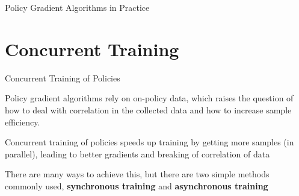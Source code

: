 \begin{frame}{Policy Gradient Algorithms in Practice}
\setcounter{subfigure}{0}
\begin{figure}[htbp]
\centering

\hfill %

\end{figure}
\vspace{2pt}
    
\end{frame}

\section{Concurrent Training}

\begin{frame}{Concurrent Training of Policies}

Policy gradient algorithms rely on on-policy data, which raises the question of how to deal with correlation in the collected data and how to increase sample efficiency. 

\blist
    \item Concurrent training of policies speeds up training by getting more samples (in parallel), leading to better gradients and breaking of correlation of data
    \item There are many ways to achieve this, but there are two simple methods commonly used, \textbf{synchronous training} and \textbf{asynchronous training}
\elist
    
\end{frame}

